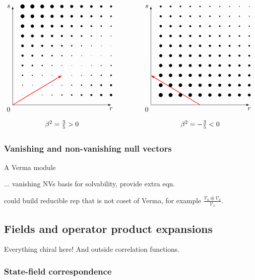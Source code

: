 \documentclass[12pt, a4paper]{article}
\theoremstyle{break}
\begin{document}
\begin{align}
 \begin{tikzpicture}[baseline=(base), scale = .5]
 \coordinate (base) at (0, 4);
  \draw[latex-latex] (0, 10) node [left] {$s$} -- (0, 0) node[below left] {$0$} -- (10, 0) node [below] {$r$};
  \draw[thick, red, -latex] (0, 0) -- (5, 3);
  \foreach \r in {1,...,10}{
  \foreach \s in {1,...,10}{
  \pgfmathsetmacro{\myrad}{.2+.12*abs(3*\r-5*\s)}
  \filldraw (\r, \s) circle [radius = \myrad pt];
  }}
  \node at (5, -2) {$\beta^2 = \frac35>0$};
 \end{tikzpicture}
 \qquad \qquad
 \begin{tikzpicture}[baseline=(base), scale = .5]
 \coordinate (base) at (0, 4);
  \draw[latex-latex] (0, 10) node [left] {$s$} -- (0, 0) node[below left] {$0$} -- (10, 0) node [below] {$r$};
  \draw[thick, red, -latex] (5, 0) -- (0, 3);
  \foreach \r in {1,...,10}{
  \foreach \s in {1,...,10}{
  \pgfmathsetmacro{\myrad}{6-(3*\r+5*\s)/15}
  \filldraw (\r, \s) circle [radius = \myrad pt];
  }}
  \node at (5, -2) {$\beta^2 = -\frac35<0$};
 \end{tikzpicture}
\end{align}



\subsubsection{Vanishing and non-vanishing null vectors}

A Verma module

... vanishing NVs basis for solvability, provide extra eqn.



could build reducible rep that is not coset of Verma, for example $\frac{\mathcal{V}_0 \oplus \mathcal{V}_0}{\mathcal{V}_1}$. 

\subsection{Fields and operator product expansions}

Everything chiral here! And outside correlation functions.

\subsubsection{State-field correspondence}
\end{document}
